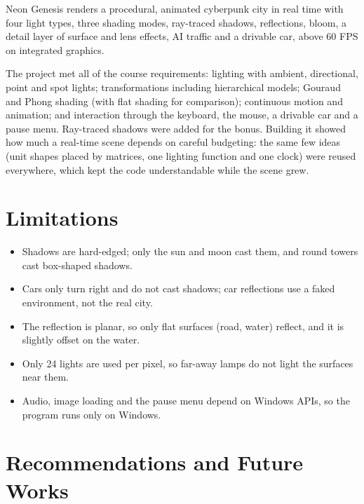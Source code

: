 \documentclass[12pt, a4paper]{report}
\begin{document}
\begin{justify}
  {\fontsize{12}{13.8}\selectfont
    Neon Genesis renders a procedural, animated cyberpunk city in real time with four light types, three shading modes, ray-traced shadows, reflections, bloom, a detail layer of surface and lens effects, AI traffic and a drivable car, above 60 FPS on integrated graphics.
  }
\end{justify}
\begin{justify}
  {\fontsize{12}{13.8}\selectfont
    The project met all of the course requirements: lighting with ambient, directional, point and spot lights; transformations including hierarchical models; Gouraud and Phong shading (with flat shading for comparison); continuous motion and animation; and interaction through the keyboard, the mouse, a drivable car and a pause menu. Ray-traced shadows were added for the bonus. Building it showed how much a real-time scene depends on careful budgeting: the same few ideas (unit shapes placed by matrices, one lighting function and one clock) were reused everywhere, which kept the code understandable while the scene grew.
  }
\end{justify}

\section{Limitations}

\begin{justify}
  {\fontsize{12}{13.8}\selectfont
    \begin{itemize}\setlength{\itemsep}{0pt}\setlength{\parskip}{0pt}
      \item Shadows are hard-edged; only the sun and moon cast them, and round towers cast box-shaped shadows.
      \item Cars only turn right and do not cast shadows; car reflections use a faked environment, not the real city.
      \item The reflection is planar, so only flat surfaces (road, water) reflect, and it is slightly offset on the water.
      \item Only 24 lights are used per pixel, so far-away lamps do not light the surfaces near them.
      \item Audio, image loading and the pause menu depend on Windows APIs, so the program runs only on Windows.
    \end{itemize}
  }
\end{justify}

\section{Recommendations and Future Works}
\end{document}
